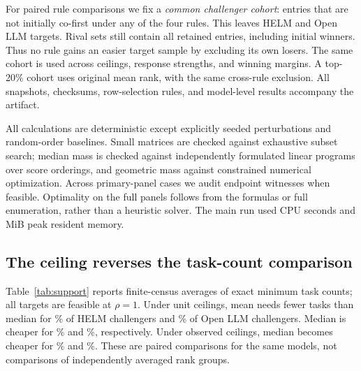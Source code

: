 \documentclass{article}
\begin{document}
For paired rule comparisons we fix a \emph{common challenger cohort}: entries
that are not initially co-first under any of the four rules. This leaves
\HelmCommon{} HELM and \OllCommon{} Open LLM targets. Rival sets still contain all
retained entries, including initial winners. Thus no rule gains an easier target
sample by excluding its own losers. The same cohort is used across ceilings,
response strengths, and winning margins. A top-20\% cohort uses original mean
rank, with the same cross-rule exclusion. All snapshots, checksums, row-selection
rules, and model-level results accompany the artifact.

All calculations are deterministic except explicitly seeded perturbations and
random-order baselines. Small matrices are checked against exhaustive subset
search; median mass is checked against independently formulated linear programs
over score orderings, and geometric mass against constrained numerical
optimization. Across \WitnessCases{} primary-panel cases we audit endpoint
witnesses when feasible. Optimality on the full panels follows from the formulas
or full enumeration, rather than a heuristic solver. The main run used
\RunCpuSeconds{} CPU seconds and \RunPeakMiB{} MiB peak resident memory.

\subsection{The ceiling reverses the task-count comparison}
\label{sec:primary}
Table~\ref{tab:support} reports finite-census averages of exact minimum task counts;
all targets are feasible at $\rho=1$. Under unit ceilings, mean needs fewer tasks
than median for \HelmUnitMedMore\% of HELM challengers and \OllUnitMedMore\% of
Open LLM challengers. Median is cheaper for \HelmUnitMedLess\% and
\OllUnitMedLess\%, respectively. Under observed ceilings, median becomes cheaper
for \HelmObservedMedLess\% and \OllObservedMedLess\%. These are paired comparisons
for the same models, not comparisons of independently averaged rank groups.

\begin{table}[t]
\centering\small\setlength{\tabcolsep}{3pt}

\caption{Mean minimum task count $K^*$ at $\rho=1$, co-first convention.
The final columns report the fraction of common challengers for which median
costs fewer or more tasks than mean. Equal cases make up the remainder. Each
panel uses its own task unit; counts should not be compared as training costs.}
\label{tab:support}
\end{table}
\end{document}
